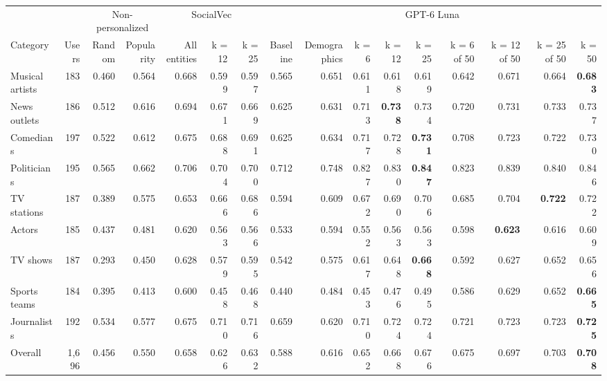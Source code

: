 \begin{tabular}{lrrrrrrrrrrrrrrr}
\toprule
 &  & \multicolumn{2}{c}{Non-personalized} & \multicolumn{3}{c}{SocialVec} & \multicolumn{9}{c}{GPT-6 Luna} \\
Category & Users & Random & Popularity & All entities & k = 12 & k = 25 & Baseline & Demographics & k = 6 & k = 12 & k = 25 & k = 6 of 50 & k = 12 of 50 & k = 25 of 50 & k = 50 \\
\midrule
Musical artists & 183 & 0.460 & 0.564 & 0.668 & 0.599 & 0.597 & 0.565 & 0.651 & 0.611 & 0.618 & 0.619 & 0.642 & 0.671 & 0.664 & \textbf{0.683} \\
News outlets & 186 & 0.512 & 0.616 & 0.694 & 0.671 & 0.669 & 0.625 & 0.631 & 0.713 & \textbf{0.738} & 0.734 & 0.720 & 0.731 & 0.733 & 0.737 \\
Comedians & 197 & 0.522 & 0.612 & 0.675 & 0.688 & 0.691 & 0.625 & 0.634 & 0.717 & 0.728 & \textbf{0.731} & 0.708 & 0.723 & 0.722 & 0.730 \\
Politicians & 195 & 0.565 & 0.662 & 0.706 & 0.704 & 0.700 & 0.712 & 0.748 & 0.827 & 0.830 & \textbf{0.847} & 0.823 & 0.839 & 0.840 & 0.846 \\
TV stations & 187 & 0.389 & 0.575 & 0.653 & 0.666 & 0.686 & 0.594 & 0.609 & 0.672 & 0.690 & 0.706 & 0.685 & 0.704 & \textbf{0.722} & 0.722 \\
Actors & 185 & 0.437 & 0.481 & 0.620 & 0.563 & 0.566 & 0.533 & 0.594 & 0.552 & 0.563 & 0.563 & 0.598 & \textbf{0.623} & 0.616 & 0.609 \\
TV shows & 187 & 0.293 & 0.450 & 0.628 & 0.579 & 0.595 & 0.542 & 0.575 & 0.617 & 0.648 & \textbf{0.668} & 0.592 & 0.627 & 0.652 & 0.656 \\
Sports teams & 184 & 0.395 & 0.413 & 0.600 & 0.458 & 0.468 & 0.440 & 0.484 & 0.453 & 0.476 & 0.495 & 0.586 & 0.629 & 0.652 & \textbf{0.665} \\
Journalists & 192 & 0.534 & 0.577 & 0.675 & 0.710 & 0.716 & 0.659 & 0.620 & 0.710 & 0.724 & 0.724 & 0.721 & 0.723 & 0.723 & \textbf{0.725} \\
\midrule
Overall & 1,696 & 0.456 & 0.550 & 0.658 & 0.626 & 0.632 & 0.588 & 0.616 & 0.652 & 0.668 & 0.676 & 0.675 & 0.697 & 0.703 & \textbf{0.708} \\
\bottomrule
\end{tabular}
